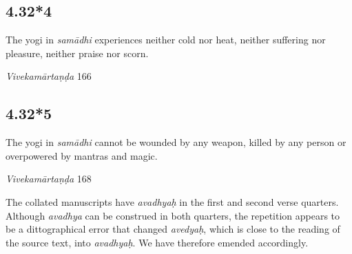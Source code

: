 \begin{ekdosis}
\subsection*{4.32*4}
\begin{translation}[hp04_032_4]
The yogi in \textit{samādhi} experiences neither cold nor heat, neither suffering nor pleasure, neither praise nor scorn.
\end{translation}

\begin{sources}[hp04_032_4]
\emph{Vivekamārtaṇḍa} 166
\begin{versinnote}
\end{versinnote}
\end{sources}



\subsection*{4.32*5}
\begin{translation}[hp04_032_5]
The yogi in \textit{samādhi} cannot be wounded by any weapon, killed by any person or overpowered by mantras and magic.
\end{translation}


\begin{sources}[hp04_032_5]
\emph{Vivekamārtaṇḍa} 168
\begin{versinnote}
\end{versinnote}
\end{sources}


\begin{philcomm}[hp04_032_5]
The collated manuscripts have \emph{avadhyaḥ} in the first and second verse quarters. Although \emph{avadhya} can be construed in both quarters, the repetition appears to be a dittographical error that changed \emph{avedyaḥ}, which is close to the reading of the source text, into \emph{avadhyaḥ}. We have therefore emended accordingly. 
\end{philcomm}


\end{ekdosis}

